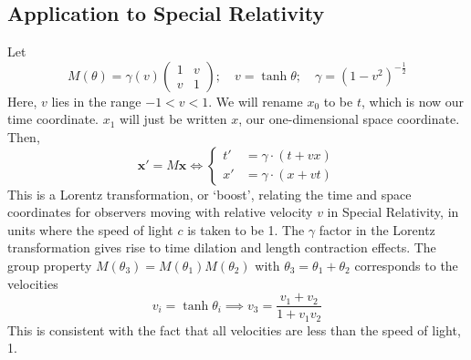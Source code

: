 \documentclass{article}
\begin{document}
	\subsection{Application to Special Relativity}
	Let
	\[ M(\theta) = \gamma(v) \begin{pmatrix}
		1 & v \\ v & 1
	\end{pmatrix};\quad v = \tanh \theta;\quad \gamma = (1 - v^2)^{-\frac{1}{2}} \]
	Here, $v$ lies in the range $-1 < v < 1$. We will rename $x_0$ to be $t$, which is now our time coordinate. $x_1$ will just be written $x$, our one-dimensional space coordinate. Then,
	\[ \bm x' = M\bm x \iff \begin{cases}
		t' &= \gamma \cdot (t + vx) \\
		x' &= \gamma \cdot (x + vt)
	\end{cases} \]
	This is a Lorentz transformation, or `boost', relating the time and space coordinates for observers moving with relative velocity $v$ in Special Relativity, in units where the speed of light $c$ is taken to be 1. The $\gamma$ factor in the Lorentz transformation gives rise to time dilation and length contraction effects. The group property $M(\theta_3) = M(\theta_1)M(\theta_2)$ with $\theta_3 = \theta_1 + \theta_2$ corresponds to the velocities
	\[ v_i = \tanh \theta_i \implies v_3 = \frac{v_1 + v_2}{1 + v_1 v_2} \]
	This is consistent with the fact that all velocities are less than the speed of light, 1.
\end{document}

